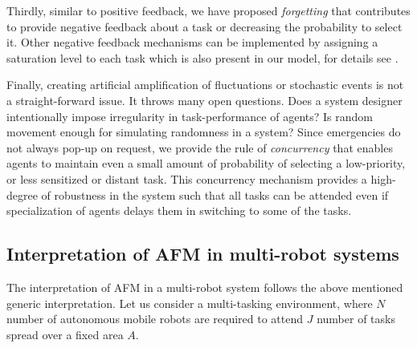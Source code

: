 \documentclass[final,5p,times,twocolumn]{elsarticle}
\begin{document}
Thirdly, similar to positive feedback, we have proposed {\em forgetting} that contributes to provide negative feedback about a task or decreasing the probability to select it. Other negative feedback mechanisms can be implemented by assigning a saturation level to each task which is also present in our model, for details see \citet{Arcaute+2008}.

Finally, creating  artificial amplification of fluctuations or stochastic events is not a straight-forward issue. It throws  many open questions. Does a system designer intentionally impose irregularity in task-performance of agents?  Is random movement  enough for simulating randomness in a system?
Since emergencies do not always pop-up on request, we provide the rule of {\em concurrency} that enables agents to  maintain even a small amount of probability of selecting a low-priority, or less sensitized or distant task. This concurrency mechanism provides a high-degree of robustness in the system such that all tasks can be attended even if specialization of agents delays them in switching to some of the tasks.
\subsection{Interpretation of AFM in multi-robot systems}
\label{afm:mrs-interpretation}
The interpretation of AFM in a multi-robot system follows the above mentioned generic interpretation. Let us consider a multi-tasking environment, where $N$ number of autonomous mobile robots are required to attend $J$ number of tasks spread over a fixed area $A$. 
\end{document}
